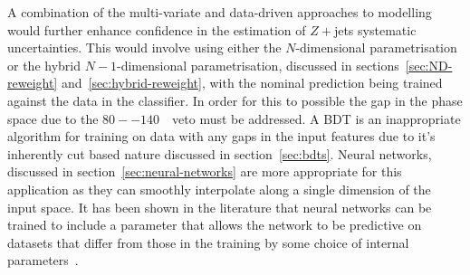A combination of the multi-variate and data-driven approaches to modelling would
further enhance confidence in the estimation of $Z+$jets systematic
uncertainties. This would involve using either the $N$-dimensional
parametrisation or the hybrid $N-1$-dimensional parametrisation, discussed in
sections~\ref{sec:ND-reweight} and~\ref{sec:hybrid-reweight}, with the nominal
prediction being trained against the data in the classifier. In order for this
to possible the gap in the phase space due to the $80--140$~\GeV\ veto must be
addressed. A BDT is an inappropriate algorithm for training on data with any
gaps in the input features due to it's inherently cut based nature discussed in
section~\ref{sec:bdts}. Neural networks, discussed in
section~\ref{sec:neural-networks} are more appropriate for this application as
they can smoothly interpolate along a single dimension of the input space. It
has been shown in the literature that neural networks can be trained to include
a parameter that allows the network to be predictive on datasets that differ
from those in the training by some choice of internal
parameters~\cite{param-hep, param-hep-2}.




